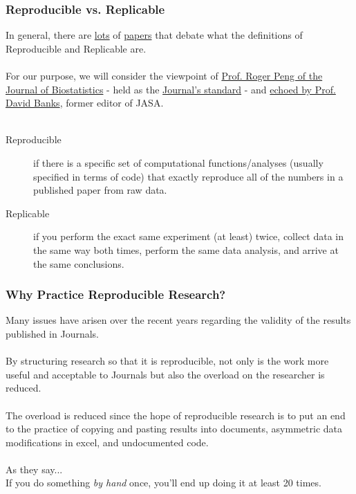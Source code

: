 \documentclass{beamer}\usepackage[]{graphicx}\usepackage[]{color}
\begin{document}
\begin{frame}
\frametitle{Reproducible vs. Replicable}
In general, there are \href{http://cogprints.org/7691/7/ICMLws09.pdf}{lots} of \href{http://magazine.amstat.org/blog/2011/07/01/trust-your-science/}{papers} that debate what the definitions of Reproducible and Replicable are. 
\\$ $\\
For our purpose, we will consider the viewpoint of \href{http://www.sciencemag.org/content/334/6060/1226.full}{Prof. Roger Peng of the Journal of Biostatistics} - held as the \href{http://biostatistics.oxfordjournals.org/content/10/3/405.full}{Journal's standard} - and \href{http://bioinformatics.mdanderson.org/Supplements/ReproRsch-All/Modified/ENAR/banksNotes.pdf}{echoed by Prof. David Banks}, former editor of JASA.
\\$ $\\
\begin{description}
\item[Reproducible] if there is a specific set of computational functions/analyses (usually specified in terms of code) that exactly reproduce all of the numbers in a published paper from raw data.
\item[Replicable] if you perform the exact same experiment (at least) twice, collect data in the same way both times, perform the same data analysis, and arrive at the same conclusions. 
\end{description}
\end{frame}

\begin{frame}
\frametitle{Why Practice Reproducible Research?}
Many issues have arisen over the recent years regarding the validity of the results published in Journals. 
\\$ $\\
By structuring research so that it is reproducible, not only is the work more useful and acceptable to Journals but also the overload on the researcher is reduced.
\\$ $\\
The overload is reduced since the hope of reproducible research is to put an end to the practice of copying and pasting results into documents, asymmetric data modifications in excel, and undocumented code.
\\$ $\\
As they say...
\\
If you do something \textit{by hand} once, you'll end up doing it at least 20 times.
\end{frame}
\end{document}
